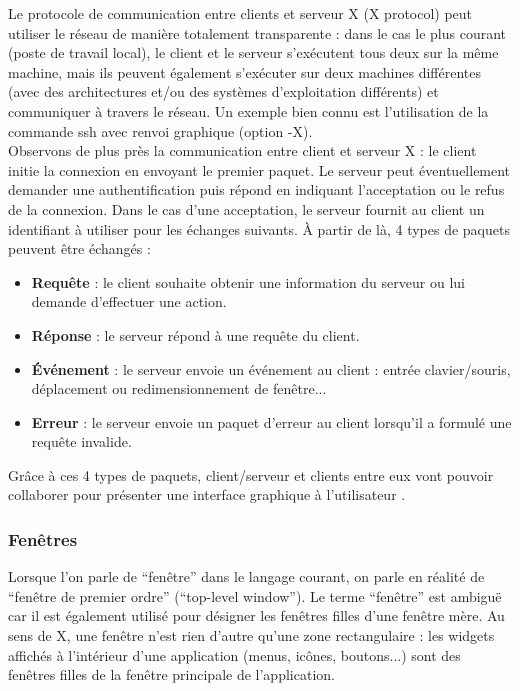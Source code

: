 Le protocole de communication entre clients et serveur X (X protocol) peut utiliser le réseau de manière totalement transparente : dans le cas le plus courant (poste de travail local), le client et le serveur s'exécutent tous deux sur la même machine, mais ils peuvent également s'exécuter sur deux machines différentes (avec des architectures et/ou des systèmes d'exploitation différents) et communiquer à travers le réseau. Un exemple bien connu est l'utilisation de la commande ssh avec renvoi graphique (option -X).\\

Observons de plus près la communication entre client et serveur X : le client initie la connexion en envoyant le premier paquet. Le serveur peut éventuellement demander une authentification puis répond en indiquant l'acceptation ou le refus de la connexion. Dans le cas d'une acceptation, le serveur fournit au client un identifiant à utiliser pour les échanges suivants. À partir de là, 4 types de paquets peuvent être échangés :
\begin{itemize} \vspace{1ex} \itemsep1ex
 \item \textbf{Requête} : le client souhaite obtenir une information du serveur ou lui demande d'effectuer une action.
 \item \textbf{Réponse} : le serveur répond à une requête du client.
 \item \textbf{Événement} : le serveur envoie un événement au client : entrée clavier/souris, déplacement ou redimensionnement de fenêtre...
 \item \textbf{Erreur} : le serveur envoie un paquet d'erreur au client lorsqu'il a formulé une requête invalide.
\end{itemize}

\vspace{1em}

Grâce à ces 4 types de paquets, client/serveur et clients entre eux vont pouvoir collaborer pour présenter une interface graphique à l'utilisateur \cite{JonesIXW} \cite{MansfieldJXO}.

\subsubsection{Fenêtres}
Lorsque l'on parle de ``fenêtre'' dans le langage courant, on parle en réalité de ``fenêtre de premier ordre'' (``top-level window''). Le terme ``fenêtre'' est ambiguë car il est également utilisé pour désigner les fenêtres filles d'une fenêtre mère. Au sens de X, une fenêtre n'est rien d'autre qu'une zone rectangulaire : les widgets affichés à l'intérieur d'une application (menus, icônes, boutons...) sont des fenêtres filles de la fenêtre principale de l'application.

